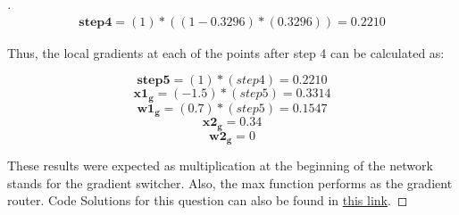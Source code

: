 \documentclass[12pt,oneside,geqno]{article}
\begin{document}
\begin{proof}[\color{red}{Solution}]
		\begin{align}
			\mathbf{step4} = (1) * ((1 - 0.3296) * (0.3296)) = 0.2210
		\end{align}
		
		Thus, the local gradients at each of the points after step 4 can be calculated as:
		
		\[\mathbf{step5} = (1) * (step4) = 0.2210 \] 
		\[\mathbf{x1_g} = (-1.5) * (step5) = 0.3314 \]  
		\[\mathbf{w1_g} = (0.7) * (step5) = 0.1547 \] 
		\[\mathbf{x2_g} = 0.34 \] 
		\[\mathbf{w2_g} = 0 \]
		
		
		These results were expected as multiplication at the beginning of the network stands for the gradient switcher. Also, the max function performs as the gradient router. Code Solutions for this question can also be found in \href{https://colab.research.google.com/drive/1O7_bI8X7BIBYwJ2gF5oAiFXH7jwp902a?authuser=1#scrollTo=ydX8Mu84z5oD}{this link}.
	\end{proof}
	
\end{document}
